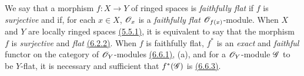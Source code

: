 \begin{env}[6.7.8]
\label{0.6.7.8}
We say that a morphism $f:X\to Y$ of ringed spaces is {\em faithfully flat} if $f$ is
{\em surjective} and if, for each $x\in X$, $\mathscr{O}_x$ is a {\em faithfully flat}
$\mathscr{O}_{f(x)}$-module. When $X$ and $Y$ are locally ringed spaces \hyperref[0.5.5.1]{(5.5.1)}, it is
equivalent to say that the morphism $f$ is {\em surjective} and {\em flat}
\hyperref[0.6.6.2]{(6.2.2)}. When $f$ is faithfully flat, $f^*$ is an {\em exact} and {\em faithful}
functor on the category of $\mathscr{O}_Y$-modules \hyperref[0.6.6.1]{(6.6.1)}, (a), and for a $\mathscr{O}_Y$-module
$\mathscr{G}$ to be $Y$-flat, it is necessary and sufficient that $f^*(\mathscr{G})$ is
\hyperref[0.6.6.3]{(6.6.3)}.
\end{env}

